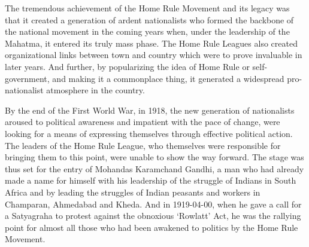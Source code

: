 \begin{multicols}{2}
The tremendous achievement of the Home Rule Movement and its legacy was that it created a generation of ardent nationalists who formed the backbone of the national movement in the coming years when, under the leadership of the Mahatma, it entered its truly mass phase. The Home Rule Leagues also created organizational links between town and country which were to prove invaluable in later years. And further, by popularizing the idea of Home Rule or self-government, and making it a commonplace thing, it generated a widespread pro-nationalist atmosphere in the country.

By the end of the First World War, in 1918, the new generation of nationalists aroused to political awareness and impatient with the pace of change, were looking for a means of expressing themselves through effective political action. The leaders of the Home Rule League, who themselves were responsible for bringing them to this point, were unable to show the way forward. The stage was thus set for the entry of Mohandas Karamchand Gandhi, a man who had already made a name for himself with his leadership of the struggle of Indians in South Africa and by leading the struggles of Indian peasants and workers in Champaran, Ahmedabad and Kheda. And in 1919-04-00, when he gave a call for a Satyagraha to protest against the obnoxious `Rowlatt' Act, he was the rallying point for almost all those who had been awakened to politics by the Home Rule Movement.

\end{multicols}
